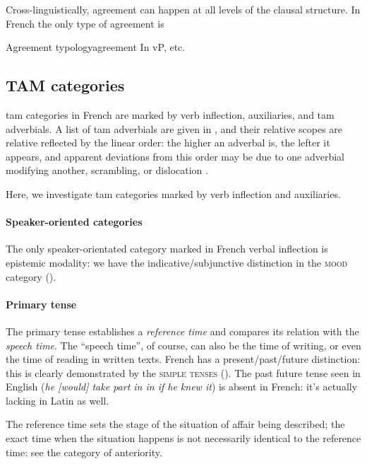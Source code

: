 \documentclass[a4paper, oneside, 12pt]{report}
\newcommand*{\citepage}[1]{p.~{#1}}
\newcommand*{\citepages}[1]{pp.~{#1}}
\newcommand{\form}[1]{\emph{#1}}
\newcommand*{\category}[1]{\textsc{#1}}
\begin{document}
Cross-linguistically, agreement can happen at all levels of the clausal structure.
In French the only type of agreement is 

\begin{todobox}{Agreement typology}{agreement}
    In vP, etc.
\end{todobox}

\subsection{TAM categories}\label{sec:grammatical.clause.tam}
\ac{tam} categories in French are marked by verb inflection, auxiliaries,
and \ac{tam} adverbials.
A list of \ac{tam} adverbials are given in \citet[\citepage{103, (3)}]{rowlett2007syntax},
and their relative scopes are relative reflected by the linear order:
the higher an adverbal is, the lefter it appears,
and apparent deviations from this order may be due to 
one adverbial modifying another,
scrambling, or dislocation \citep[\citepages{104-105}]{rowlett2007syntax}.

Here, we investigate \ac{tam} categories marked by verb inflection and auxiliaries.

\paragraph*{Speaker-oriented categories} 
The only speaker-orientated category marked in French verbal inflection is epistemic modality:
we have the indicative/subjunctive distinction in the \category{mood} category
().

\paragraph*{Primary tense}
The primary tense establishes a \emph{reference time}
and compares its relation with the \emph{speech time}.
The ``speech time'', of course, can also be the time of writing,
or even the time of reading in written texts. 
French has a present/past/future distinction:
this is clearly demonstrated by the \category{simple tenses}
(). 
The past future tense seen in English (\form{he [would] take part in in if he knew it})
is absent in French: it's actually lacking in Latin as well.

The reference time sets the stage of the situation of affair being described;
the exact time when the situation happens is not necessarily identical to the reference time:
see the category of anteriority. 
\end{document}
